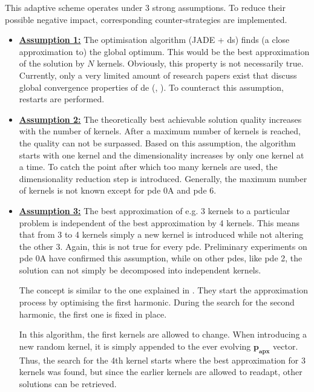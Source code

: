 \documentclass[./\jobname.tex]{subfiles}
\begin{document}
This adaptive scheme operates under 3 strong assumptions. To reduce their possible negative impact, corresponding counter-strategies are implemented. 
\begin{itemize}
	\item \underline{\textbf{Assumption 1:}} The optimisation algorithm (JADE + \gls{ds}) finds (a close approximation to) the global optimum. This would be the best approximation of the solution by $N$ kernels. Obviously, this property is not necessarily true. Currently, only a very limited amount of research papers exist that discuss global convergence properties of \gls{de} (\cite{hu_sufficient_2013}, \cite{opara_differential_2019}). To counteract this assumption, restarts are performed. 
	\item \underline{\textbf{Assumption 2:}} The theoretically best achievable solution quality increases with the number of kernels. After a maximum number of kernels is reached, the quality can not be surpassed. Based on this assumption, the algorithm starts with one kernel and the dimensionality increases by only one kernel at a time. To catch the point after which too many kernels are used, the dimensionality reduction step is introduced. Generally, the maximum number of kernels is not known except for \gls{pde} 0A and \gls{pde} 6. 
	\item \underline{\textbf{Assumption 3:}} The best approximation of e.g. 3 kernels to a particular problem is independent of the best approximation by 4 kernels. This means that from 3 to 4 kernels simply a new kernel is introduced while not altering the other 3. Again, this is not true for every \gls{pde}. Preliminary experiments on \gls{pde} 0A have confirmed this assumption, while on other \gls{pde}s, like \gls{pde} 2, the solution can not simply be decomposed into independent kernels. 
	
	The concept is similar to the one explained in \cite{chaquet_solving_2012}. They start the approximation process by optimising the first harmonic. During the search for the second harmonic, the first one is fixed in place. 
	
	In this algorithm, the first kernels are allowed to change. When introducing a new random kernel, it is simply appended to the ever evolving $\mathbf{p_{apx}}$ vector. Thus, the search for the 4th kernel starts where the best approximation for 3 kernels was found, but since the earlier kernels are allowed to readapt, other solutions can be retrieved.
\end{itemize} 
\end{document}
